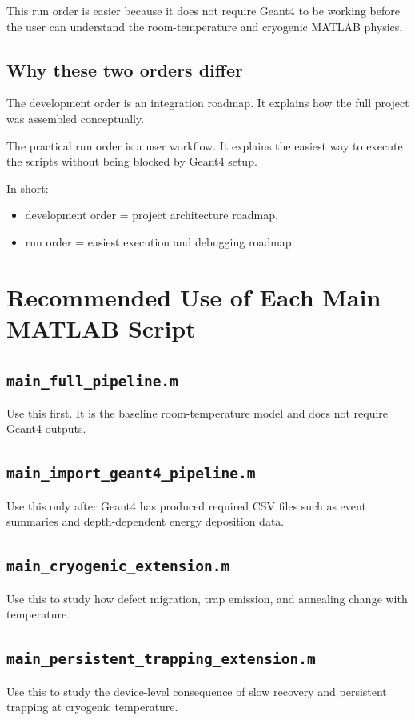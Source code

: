 \documentclass[11pt]{article}
\begin{document}
This run order is easier because it does not require Geant4 to be working before the user can understand the room-temperature and cryogenic MATLAB physics.

\subsection{Why these two orders differ}
The development order is an integration roadmap. It explains how the full project was assembled conceptually.

The practical run order is a user workflow. It explains the easiest way to execute the scripts without being blocked by Geant4 setup.

In short:
\begin{itemize}[leftmargin=2em]
    \item development order = project architecture roadmap,
    \item run order = easiest execution and debugging roadmap.
\end{itemize}

\section{Recommended Use of Each Main MATLAB Script}
\subsection*{\texttt{main\_full\_pipeline.m}}
Use this first. It is the baseline room-temperature model and does not require Geant4 outputs.

\subsection*{\texttt{main\_import\_geant4\_pipeline.m}}
Use this only after Geant4 has produced required CSV files such as event summaries and depth-dependent energy deposition data.

\subsection*{\texttt{main\_cryogenic\_extension.m}}
Use this to study how defect migration, trap emission, and annealing change with temperature.

\subsection*{\texttt{main\_persistent\_trapping\_extension.m}}
Use this to study the device-level consequence of slow recovery and persistent trapping at cryogenic temperature.
\end{document}
